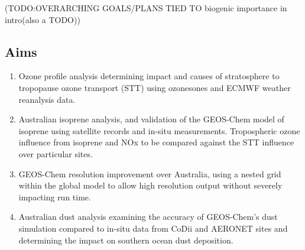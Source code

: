 (TODO:OVERARCHING GOALS/PLANS
TIED TO biogenic importance in intro(also a TODO))

\subsection{Aims}
\begin{enumerate}
\item Ozone profile analysis determining impact and causes of stratosphere to tropopause ozone transport (STT) using ozonesones and ECMWF weather reanalysis data.
\item Australian isoprene analysis, and validation of the GEOS-Chem model of isoprene using satellite records and in-situ measurements. 
Tropospheric ozone influence from isoprene and NOx to be compared against the STT influence over particular sites. 
\item GEOS-Chem resolution improvement over Australia, using a nested grid within the global model to allow high resolution output without severely impacting run time.
\item Australian dust analysis examining the accuracy of GEOS-Chem's dust simulation compared to in-situ data from CoDii and AERONET sites and determining the impact on southern ocean dust deposition.
\end{enumerate}